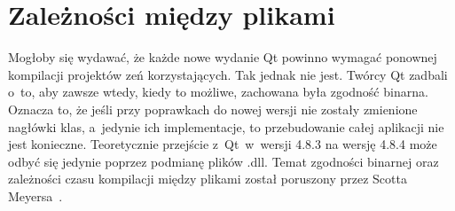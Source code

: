 


\section{Zależności między plikami}
Mogłoby się wydawać, że każde nowe wydanie Qt powinno wymagać ponownej kompilacji projektów zeń korzystających. Tak jednak nie jest. Twórcy Qt zadbali o~to, aby zawsze wtedy, kiedy to możliwe, zachowana była zgodność binarna. Oznacza to, że jeśli przy poprawkach do nowej wersji nie zostały zmienione nagłówki klas, a~jedynie ich implementacje, to przebudowanie całej aplikacji nie jest konieczne. Teoretycznie przejście z~Qt~w~wersji 4.8.3 na wersję 4.8.4 może odbyć się jedynie poprzez podmianę plików .dll. Temat zgodności binarnej oraz zależności czasu kompilacji między plikami został poruszony przez Scotta Meyersa~\cite{50Ways}.

